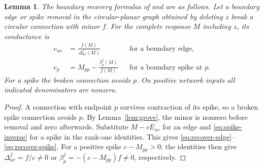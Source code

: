 \documentclass[11pt]{article}
\newtheorem{lemma}[theorem]{Lemma}
\theoremstyle{definition}
\begin{document}
\begin{lemma}
\label{lem:feature-recovery}
The boundary recovery formulas of \cite[Corollaries 4.3--4.4]{CIM}
and \cite[Lemma 10]{ABCC} are as follows.
Let a boundary edge or spike removal in the circular-planar graph
obtained by deleting \(z\) break a circular connection with minor \(f\).
For the complete response \(M\) including \(z\), its conductance is
\begin{align}
 c_{uv}&=\frac{f(M)}{\Delta^f_{uv}(M)}
 &&\text{for a boundary edge},\label{eq:recover-edge}\\
 c_p&=M_{pp}-\frac{\beta^f_p(M)}{f(M)}
 &&\text{for a boundary spike at \(p\)}.\label{eq:recover-spike}
\end{align}
For a spike the broken connection avoids \(p\).
On positive network inputs all indicated denominators are nonzero.
\end{lemma}
\begin{proof}
A connection with endpoint \(p\) survives contraction of its spike,
so a broken spike connection avoids \(p\).
By Lemma~\ref{lem:grove}, the minor is nonzero before removal and
zero afterwards. Substitute \(M-cE_{uv}\) for an edge and
\eqref{eq:spike-inverse} for a spike in the rank-one identities.
This gives \eqref{eq:recover-edge}--\eqref{eq:recover-spike}.
For a positive spike \(c-M_{pp}>0\); the identities then give
\(\Delta^f_{uv}=f/c\ne0\) or
\(\beta^f_p=-(c-M_{pp})f\ne0\), respectively.
\end{proof}
\end{document}
